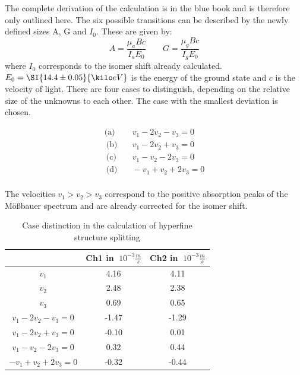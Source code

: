 The complete derivation of the calculation is in the blue book and is therefore only outlined here. The six possible transitions can be described by the newly defined sizes A, G and $I_0$. These are given by:
\begin{equation}
    A = \frac{\mu_aBc}{I_aE_0} \qquad
    G = \frac{\mu_gBc}{I_gE_0}
\end{equation}
where $I_0$ corresponds to the isomer shift already calculated. $E_0 =\SI{14.4\pm0.05}{\kilo eV}$ is the energy of the ground state and $c$ is the velocity of light. There are four cases to distinguish, depending on the relative size of the unknowns to each other. The case with the smallest deviation is chosen.

\begin{align*}
\text{(a)}& \quad v_1-2v_2-v_3=0 \\\
\text{(b)}& \quad v_1-2v_2+v_3=0 \\\
\text{(c)}& \quad v_1-v_2-2v_3=0 \\\
\text{(d)}& \quad -v_1+v_2+2v_3=0 \\\
\end{align*}

The velocities $v_1 >v_2 >v_3$ correspond to the positive absorption peaks of the Mößbauer spectrum and are already corrected for the isomer shift.

\begin{table}
    \centering
    \caption{Case distinction in the calculation of hyperfine structure splitting}
    \begin{tabular}{c c c}
    \toprule
         &Ch1 in $\SI{}{10^{-3}\frac{m}{s}}$ &Ch2 in $\SI{}{10^{-3}\frac{m}{s}}$  \\
         \hline
         $v_1$&4.16 &4.11 \\
         $v_2$&2.48&2.38 \\
         $v_3$&0.69&0.65 \\
         \hline
         $v_1-2v_2-v_3=0$&-1.47&-1.29\\
         $v_1-2v_2+v_3=0$&-0.10&0.01\\
         $v_1-v_2-2v_3=0$&0.32&0.44\\
         $-v_1+v_2+2v_3=0$&-0.32&-0.44\\
         
         
         
    \bottomrule
    \end{tabular}
    \label{tab:fe1}
\end{table}

